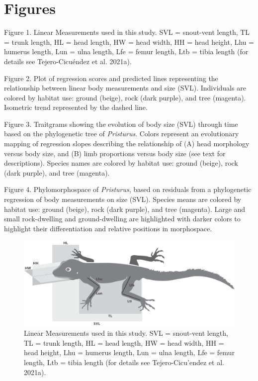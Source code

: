 \documentclass[
  11pt,
]{article}
\begin{document}
\newpage

\hypertarget{figures}{%
\section{Figures}\label{figures}}

Figure 1. Linear Measurements used in this study. SVL = snout-vent
length, TL = trunk length, HL = head length, HW = head width, HH = head
height, Lhu = humerus length, Lun = ulna length, Lfe = femur length, Ltb
= tibia length (for details see Tejero-Cicuéndez et al. 2021a).
\hfill\break

Figure 2. Plot of regression scores and predicted lines representing the
relationship between linear body measurements and size (SVL).
Individuals are colored by habitat use: ground (beige), rock (dark
purple), and tree (magenta). Isometric trend represented by the dashed
line. \hfill\break

Figure 3. Traitgrams showing the evolution of body size (SVL) through
time based on the phylogenetic tree of \emph{Pristurus}. Colors
represent an evolutionary mapping of regression slopes describing the
relationship of (A) head morphology versus body size, and (B) limb
proportions versus body size (see text for descriptions). Species names
are colored by habitat use: ground (beige), rock (dark purple), and tree
(magenta). \hfill\break

Figure 4. Phylomorphospace of \emph{Pristurus}, based on residuals from
a phylogenetic regression of body measurements on size (SVL). Species
means are colored by habitat use: ground (beige), rock (dark purple),
and tree (magenta). Large and small rock-dwelling and ground-dwelling
are highlighted with darker colors to highlight their differentiation
and relative positions in morphospace.

\newpage

\begin{figure}

{\centering \includegraphics[width=1\linewidth]{Figs/Fig1} 

}

\caption{Linear Measurements used in this study. SVL = snout-vent length, TL = trunk length, HL = head length, HW = head width, HH = head height, Lhu = humerus length, Lun = ulna length, Lfe = femur length, Ltb = tibia length (for details see Tejero-Cicu{'{e}}ndez et al. 2021a).}\label{fig:unnamed-chunk-3}
\end{figure}
\end{document}
